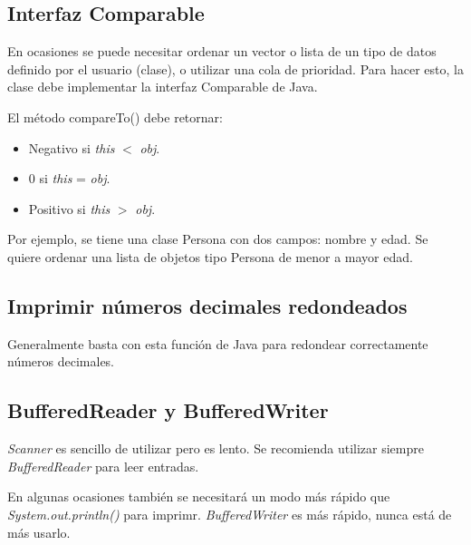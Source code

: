 \documentclass{article}
\begin{document}
\begin{multicols}{2}
	\subsection{Interfaz Comparable}
	En ocasiones se puede necesitar ordenar un vector o lista de un tipo de datos definido por el usuario (clase), o utilizar una cola de prioridad. Para hacer esto, la clase debe implementar la interfaz Comparable de Java.

	El método compareTo() debe retornar:
	\begin{itemize}
		\item Negativo si \emph{this} \( < \) \emph{obj}.
		\item 0 si \emph{this} = \emph{obj}.
		\item Positivo si \emph{this} \( > \) \emph{obj}.
	\end{itemize}	
	
	Por ejemplo, se tiene una clase Persona con dos campos: nombre y edad. Se quiere ordenar una lista de objetos tipo Persona de menor a mayor edad.
	
	
	\subsection{Imprimir números decimales redondeados}
	Generalmente basta con esta función de Java para redondear correctamente números decimales.	
	
	
	\subsection{BufferedReader y BufferedWriter}
	\emph{Scanner} es sencillo de utilizar pero es lento. Se recomienda utilizar siempre \emph{BufferedReader} para leer entradas.
	
	En algunas ocasiones también se necesitará un modo más rápido que \emph{System.out.println()} para imprimr. \emph{BufferedWriter} es más rápido, nunca está de más usarlo.
	

\end{multicols}	
\end{document}
